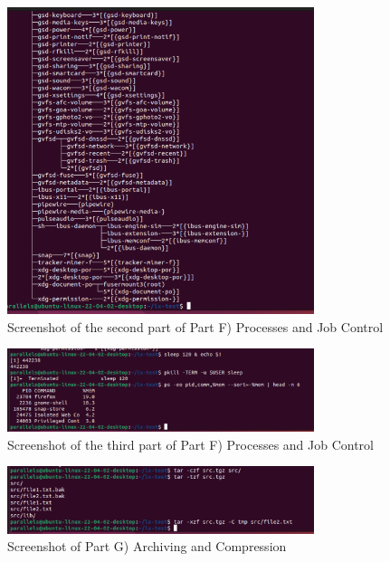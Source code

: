 \begin{figure}[h!]
    \centering
    \includegraphics[width=0.8\textwidth]{linuxptF2.png}
    \caption{Screenshot of the second part of Part F) Processes and Job Control}
    \label{fig:problemsetEpt2}
    
\end{figure}

\begin{figure}[h!]
    \centering
    \includegraphics[width=0.8\textwidth]{linuxptF3.png}
    \caption{Screenshot of the third part of Part F) Processes and Job Control}
    \label{fig:problemsetFpt3}
    
\end{figure}

\begin{figure}[h!]
    \centering
    \includegraphics[width=0.8\textwidth]{linuxptG.png}
    \caption{Screenshot of Part G) Archiving and Compression}
    \label{fig:problemsetG}
    
\end{figure}

